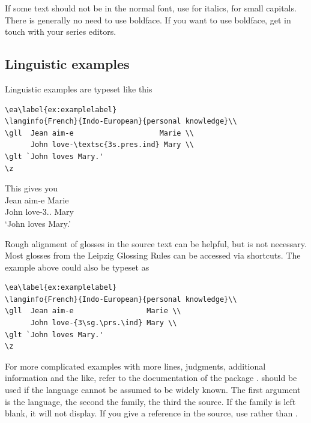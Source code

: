 If some text should not be in the normal font, use 
 for italics, 
 for small capitals. There is generally no need to use boldface. If you want to use boldface, get in touch with your series editors.

\subsection{Linguistic examples}
Linguistic examples are typeset like this

\begin{verbatim}
\ea\label{ex:examplelabel}
\langinfo{French}{Indo-European}{personal knowledge}\\
\gll  Jean aim-e                    Marie \\
      John love-\textsc{3s.pres.ind} Mary \\
\glt `John loves Mary.'    
\z
\end{verbatim}

This gives you
\ea\label{ex:examplelabel}
\\
\gll  Jean aim-e Marie \\
      John love-{3\sg.\prs.\ind} Mary \\
\glt `John loves Mary.'    
\z

Rough alignment of glosses in the source text can be helpful, but is not necessary.
Most glosses from the Leipzig Glossing Rules can be accessed via shortcuts. The example above could also be typeset as

\begin{verbatim}
\ea\label{ex:examplelabel}
\langinfo{French}{Indo-European}{personal knowledge}\\
\gll  Jean aim-e                 Marie \\
      John love-{3\sg.\prs.\ind} Mary \\
\glt `John loves Mary.'    
\z
\end{verbatim}

For more complicated examples with more lines, judgments, additional information and the like, refer to the documentation of the package .
 should be used if the language cannot be assumed to be widely known. The first argument is the language, the second the family, the third the source. If the family is left blank, it will not display. If you give a reference in the source, use  rather than .

